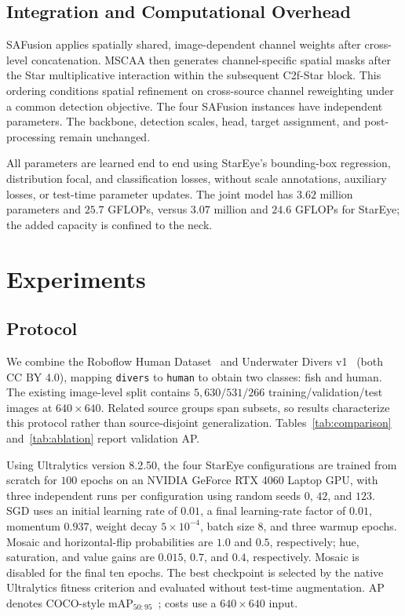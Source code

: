 \documentclass[letterpaper,10pt,conference]{ieeeconf}
\begin{document}
\subsection{Integration and Computational Overhead}
SAFusion applies spatially shared, image-dependent channel weights
after cross-level concatenation. MSCAA then generates channel-specific
spatial masks after the Star multiplicative interaction within the
subsequent C2f-Star block. This ordering conditions spatial refinement
on cross-source channel reweighting under a common detection objective.
The four SAFusion instances have independent parameters. The backbone,
detection scales, head, target assignment, and post-processing remain
unchanged.

All parameters are learned end to end using StarEye's bounding-box
regression, distribution focal, and classification losses, without
scale annotations, auxiliary losses, or test-time parameter updates.
The joint model has \(3.62\) million parameters and \(25.7\) GFLOPs,
versus \(3.07\) million and \(24.6\) GFLOPs for StarEye;
the added capacity is confined to the neck.

\section{Experiments}
\subsection{Protocol}
We combine the Roboflow Human Dataset~\cite{ref_human}
and Underwater Divers v1~\cite{ref_divers} (both CC BY 4.0),
mapping \texttt{divers} to \texttt{human} to obtain two classes:
fish and human. The existing image-level split contains \(5{,}630/531/266\)
training/validation/test images at \(640\times640\). Related source groups
span subsets, so results characterize this protocol rather than
source-disjoint generalization. Tables~\ref{tab:comparison}
and~\ref{tab:ablation} report validation AP.

Using Ultralytics version 8.2.50, the four StarEye configurations are trained
from scratch for \(100\) epochs on an NVIDIA GeForce RTX 4060 Laptop GPU,
with three independent runs per configuration using random seeds \(0\),
\(42\), and \(123\). SGD uses an initial learning rate of \(0.01\),
a final learning-rate factor of \(0.01\), momentum \(0.937\), weight decay
\(5\times10^{-4}\), batch size \(8\), and three warmup epochs. Mosaic and
horizontal-flip probabilities are \(1.0\) and \(0.5\), respectively; hue,
saturation, and value gains are \(0.015\), \(0.7\), and \(0.4\), respectively.
Mosaic is disabled for the final ten epochs. The best checkpoint is selected by the native
Ultralytics fitness criterion and evaluated without test-time augmentation. AP
denotes COCO-style \(\mathrm{mAP}_{50:95}\)~\cite{ref_coco}; costs use a
\(640\times640\) input.
\end{document}
